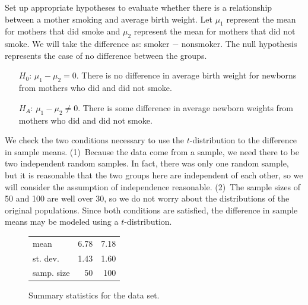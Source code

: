 \begin{examplewrap}
\begin{nexample}{Set up appropriate hypotheses to evaluate whether there is a relationship between a mother smoking and average birth weight.}\label{babySmokeHTForWeight}
Let $\mu_{1}$ represent the mean for mothers that did smoke and $\mu_2$ represent the mean for mothers that did not smoke.  We will take the difference as: smoker $-$ nonsmoker.  The null hypothesis represents the case of no difference between the groups.
\begin{itemize}
\setlength{\itemsep}{0mm}
\item[$H_0$:] $\mu_{1} - \mu_{2} = 0$.  There is no difference in average birth weight for newborns from mothers who did and did not smoke. 
\item[$H_A$:] $\mu_{1} - \mu_{2} \neq 0$. There is some difference in average newborn weights from mothers who did and did not smoke.
\end{itemize}
\end{nexample}
\end{examplewrap}

We check the two conditions necessary to use the $t$-distribution to the difference in sample means. (1)~Because the data come from a sample, we need there to be two independent random samples.  In fact, there was only one random sample, but it is reasonable that the two groups here are independent of each other, so we will consider the assumption of independence reasonable.  (2)~The sample sizes of 50 and 100 are well over 30, so we do not worry about the distributions of the original populations.  Since both conditions are satisfied, the difference in sample means may be modeled using a $t$-distribution.


\begin{figure}[hhh]
\centering
\begin{tabular}{lrr}
	& \resp{smoker} & \resp{nonsmoker} \\
\hline
mean & 6.78 & 7.18 \\
st. dev. & 1.43 & 1.60 \\
samp. size & 50 & 100 \\
\hline
\end{tabular}
\caption{Summary statistics for the  data set.}
\label{summaryStatsOfBirthWeightForNewbornsFromSmokingAndNonsmokingMothers}
\end{figure}

